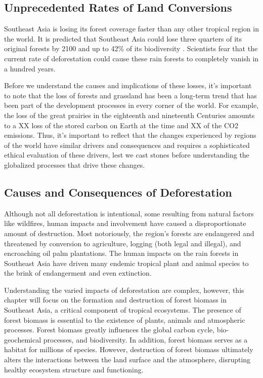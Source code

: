 \subsection{Unprecedented Rates of Land Conversions}

Southeast Asia is losing its forest coverage faster than any other tropical region in the world. It is predicted that Southeast Asia could lose three quarters of its original forests by 2100 and up to 42\% of its biodiversity \citep{sodhi2004southeast}. Scientists fear that the current rate of deforestation could cause these rain forests to completely vanish in a hundred years. 

Before we understand the causes and implications of these losses, it's important to note that the loss of forests and grassland has been a long-term trend that has been part of the development processes in every corner of the world. For example, the loss of the great prairies in the eighteenth and nineteenth Centuries amounts to a XX loss of the stored carbon on Earth at the time and XX of the CO2 emissions. Thus, it's important to reflect that the changes experienced by regions of the world have similar drivers and consequences and requires a sophisticated ethical evaluation of these drivers, lest we cast stones before understanding the globalized processes that drive these changes. 

\subsection{Causes and Consequences of Deforestation}

Although not all deforestation is intentional, some resulting from natural factors like wildfires, human impacts and involvement have caused a disproportionate amount of destruction. Most notoriously, the region's forests are endangered and threatened by conversion to agriculture, logging (both legal and illegal), and encroaching oil palm plantations. The human impacts on the rain forests in Southeast Asia have driven many endemic tropical plant and animal species to the brink of endangerment and even extinction. 
 
Understanding the varied impacts of deforestation are complex, however, this chapter will focus on the formation and destruction of forest biomass in Southeast Asia, a critical component of tropical ecosystems. The presence of forest biomass is essential to the existence of plants, animals and atmospheric processes. Forest biomass greatly influences the global carbon cycle, bio-geochemical processes, and biodiversity.  In addition, forest biomass serves as a habitat for millions of species. However, destruction of forest biomass ultimately alters the interactions between the land surface and the atmosphere, disrupting healthy ecosystem structure and functioning. 

